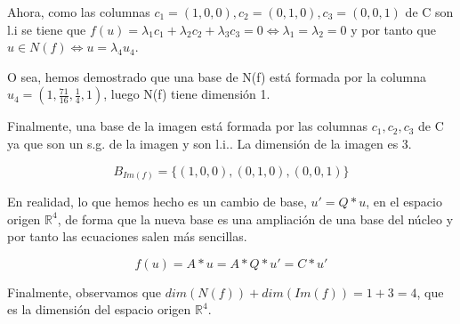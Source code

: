 \documentclass[11pt, a4paper]{article}
\newif\IfInSansMode
\newcommand{\R}{\mathbb{R}} \newcommand{\N}{\mathbb{N}}
\theoremstyle{theorem-style}
\theoremstyle{definition-style}
\theoremstyle{remark-style}
\theoremstyle{example-style}
\begin{document}
Ahora, como las columnas  $c_1 = (1,0,0), c_2 = (0,1,0), c_3 = (0,0,1)$ de C son l.i se tiene que $f(u)=\lambda_1c_1+\lambda_2c_2+\lambda_3c_3 = 0 \Leftrightarrow \lambda_1=\lambda_2=0$ y por tanto que $u \in N(f) \Leftrightarrow u=\lambda_4u_4$.

O sea, hemos demostrado que una base de N(f) está formada por la columna $u_4=(1,\frac{71}{16},\frac{1}{4},1)$, luego N(f) tiene dimensión 1.

Finalmente, una base de la imagen está formada por las columnas $c_1, c_2, c_3$ de C ya que son un s.g. de la imagen y son l.i.. La dimensión de la imagen es 3.

$$B_{Im(f)}=\{(1,0,0),(0,1,0),(0,0,1)\}$$

En realidad, lo que hemos hecho es un cambio de base, $u'= Q*u$, en el espacio origen $\R^4$, de forma que la nueva base es una ampliación de una base del núcleo y por tanto las ecuaciones salen más sencillas.

$$f(u)=A*u=A*Q*u'=C*u'$$

Finalmente, observamos que $dim(N(f))+dim(Im(f))=1+3=4$, que es la dimensión del espacio origen $\R^4$.

\end{document}
